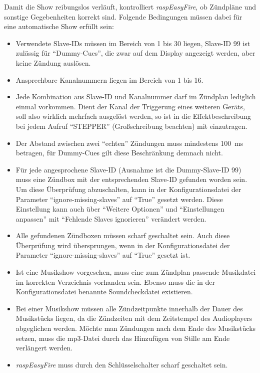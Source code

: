 \documentclass[paper=a4, parskip, numbers=noenddot, toc=listof, headsepline]{scrbook}
\newcommand{\REF}{\emph{raspEasyFire}}
\begin{document}
				Damit die Show reibungslos verläuft, kontrolliert {\REF}, ob Zündpläne und sonstige Gegebenheiten korrekt sind. Folgende Bedingungen müssen dabei für eine automatische Show erfüllt sein:
				\begin{itemize}
					\item
					      Verwendete Slave-IDs müssen im Bereich von 1 bis 30 liegen, Slave-ID 99 ist zulässig für \enquote{Dummy-Cues}, die zwar auf dem Display angezeigt werden, aber keine Zündung auslösen.
					\item
					      Ansprechbare Kanalnummern liegen im Bereich von 1 bis 16.
					\item
					      Jede Kombination aus Slave-ID und Kanalnummer darf im Zündplan lediglich einmal vorkommen. Dient der Kanal der Triggerung eines weiteren Geräts, soll also wirklich mehrfach ausgelöst werden, so ist in die Effektbeschreibung bei jedem Aufruf \enquote{STEPPER} (Großschreibung beachten) mit einzutragen.
					\item
					      Der Abstand zwischen zwei \enquote{echten} Zündungen muss mindestens \SI{100}{\milli\second} betragen, für Dummy-Cues gilt diese Beschränkung demnach nicht.
					\item
					      Für jede angesprochene Slave-ID (Ausnahme ist die Dummy-Slave-ID 99) muss eine Zündbox mit der entsprechenden Slave-ID gefunden worden sein. Um diese Überprüfung abzuschalten, kann in der Konfigurationsdatei der Parameter \enquote{ignore-missing-slaves} auf \enquote{True} gesetzt werden. Diese Einstellung kann auch über \enquote{Weitere Optionen} und \enquote{Einstellungen anpassen} mit \enquote{Fehlende Slaves ignorieren} verändert werden.
					\item
					      Alle gefundenen Zündboxen müssen scharf geschaltet sein. Auch diese Überprüfung wird übersprungen, wenn in der Konfigurationsdatei der Parameter \enquote{ignore-missing-slaves} auf \enquote{True} gesetzt ist.
					\item
					      Ist eine Musikshow vorgesehen, muss eine zum Zündplan passende Musikdatei im korrekten Verzeichnis vorhanden sein. Ebenso muss die in der Konfigurationsdatei benannte Soundcheckdatei existieren.
					\item
					      Bei einer Musikshow müssen alle Zündzeitpunkte innerhalb der Dauer des Musikstücks liegen, da die Zündzeiten mit dem Zeitstempel des Audioplayers abgeglichen werden. Möchte man Zündungen nach dem Ende des Musikstücks setzen, muss die mp3-Datei durch das Hinzufügen von Stille am Ende verlängert werden.
					\item
					      {\REF} muss durch den Schlüsselschalter scharf geschaltet sein.
				\end{itemize}
\end{document}
